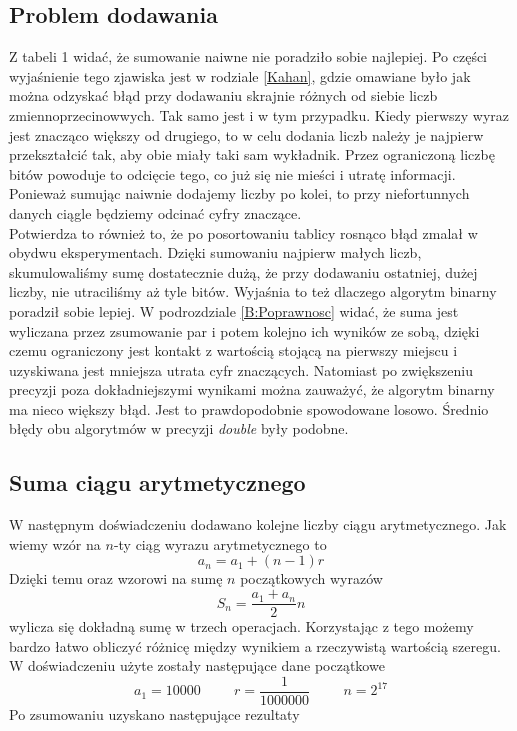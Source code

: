 \documentclass[11pt, wide]{article}
\begin{document}
    \subsection{Problem dodawania}
    Z tabeli 1 widać, że sumowanie naiwne nie poradziło sobie najlepiej. Po części wyjaśnienie tego zjawiska jest w rodziale \ref{Kahan}, gdzie omawiane było 
    jak można odzyskać błąd przy dodawaniu skrajnie różnych od siebie liczb zmiennoprzecinowwych. Tak samo jest i w tym
    przypadku. Kiedy pierwszy wyraz jest znacząco większy od drugiego, to w celu dodania liczb należy je 
    najpierw przekształcić tak, aby obie miały taki sam wykładnik. Przez ograniczoną
    liczbę bitów powoduje to odcięcie tego, co już się nie mieści i utratę informacji. Ponieważ sumując naiwnie
    dodajemy liczby po kolei, to przy niefortunnych danych ciągle będziemy odcinać cyfry znaczące. 
    \\
    
    Potwierdza to również to, że po posortowaniu tablicy rosnąco błąd zmalał w obydwu eksperymentach. Dzięki
    sumowaniu najpierw małych liczb, skumulowaliśmy sumę dostatecznie dużą, że przy dodawaniu ostatniej, dużej liczby, nie utraciliśmy aż tyle bitów.
    Wyjaśnia to też dlaczego algorytm binarny poradził sobie lepiej. W podrozdziale \ref{B:Poprawnosc} widać, że suma jest
    wyliczana przez zsumowanie par i potem kolejno ich wyników ze sobą, dzięki czemu ograniczony jest kontakt z wartością stojącą na pierwszy miejscu i uzyskiwana jest mniejsza utrata
    cyfr znaczących. Natomiast po zwiększeniu precyzji poza dokładniejszymi wynikami można zauważyć, że algorytm binarny
    ma nieco większy błąd. Jest to prawdopodobnie spowodowane losowo. Średnio błędy obu algorytmów w precyzji \textsl{double} były podobne.


    
    \subsection{Suma ciągu arytmetycznego}
    W następnym doświadczeniu dodawano kolejne liczby ciągu arytmetycznego.
    Jak wiemy wzór na $n$-ty ciąg wyrazu arytmetycznego to
    $$a_n = a_1 + (n - 1)r$$
    Dzięki temu oraz wzorowi na sumę $n$ początkowych wyrazów
    $$S_n = \frac{a_1+a_n}{2}n$$
    wylicza się dokładną sumę w trzech operacjach. Korzystając z tego możemy
    bardzo łatwo obliczyć różnicę między wynikiem a rzeczywistą wartością szeregu. W doświadczeniu użyte zostały
    następujące dane początkowe 
    $$a_1 = 10000 \hspace{1cm} r = \frac{1}{1000000} \hspace{1cm} n = 2^{17}$$
    Po zsumowaniu uzyskano następujące rezultaty
\end{document}
